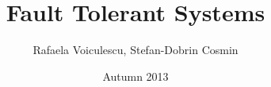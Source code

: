 \documentclass[11pt]{article} %
\title{Fault Tolerant Systems}
\author{Rafaela Voiculescu, Stefan-Dobrin Cosmin}
\date{Autumn 2013}
\begin{document}
\maketitle \newpage
\tableofcontents \newpage 







 

\nocite{*}

\end{document}
